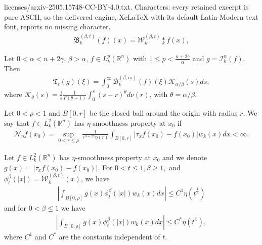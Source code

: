 \documentclass[10pt,a4paper]{amsart}
\begin{document}
licenses/arxiv-2505.15748-CC-BY-4.0.txt. Characters: every retained excerpt is pure ASCII, so the delivered engine, XeLaTeX with its default Latin Modern text font, reports no missing character.
\begin{align} \label{beta-convolution}
    \mathfrak{B}_k^{(\beta,t)}(f)(x)= \mathcal{W}_k^{(\beta,t)} \underset{k}{\ast} f(x),
\end{align}

\begin{lemma}\label{Lemma-R-2}
    Let $0< \alpha < n+2\gamma$, $\beta >\alpha $, $f\in L_k^p(\mathbb{R}^n)$ with $1\leq p < \frac{n+2\gamma}{\alpha}$ and $g=\mathcal{I}_k^\alpha(f)$. Then
    \begin{align*}
        \mathfrak{T}_\epsilon (g)(\xi)= \int_0^\infty \mathcal{B}_k^{(\beta, \epsilon s)}(f)(\xi)\mathcal{K}_{\alpha/\beta}(s)ds,
    \end{align*} where $\mathcal{K}_{\theta}(s)= \frac{1}{s} \frac{1}{\Gamma(\theta+1)}\int_0^s (s-r)^\theta d\nu(r)$, with $\theta=\alpha/\beta$. 
\end{lemma}

\begin{definition}
Let $0< \rho < 1$ and $B[0,r]$ be the closed ball around the origin with radius $r$.  We say that  $f\in L_k^{2}(\mathbb{R}^n)$ has $\eta$-smoothness property at $x_0$ if 
       \begin{align} \label{smoothness-1}
            \mathcal{N}_{\eta}f(x_0) = \underset{0<r\leq \rho}{\sup} \, \frac{1}{r^{n+2\gamma}\eta(r)} \int_{B[0,r]} |\tau_{x}f(x_0)-f(x_0)|w_k(x)dx < \infty.
       \end{align} 

\end{definition}

\begin{corollary} \label{corollary-5.4}
    Let $f\in L_k^2(\mathbb{R}^n)$ has $\eta$-smoothness property at $x_0$ and we denote $g(x)=|\tau_xf(x_0)-f(x_0)|$. For $0<t\leq 1, \beta \geq 1,$ and 
    $\phi_t^\beta(|x|)=\mathcal{W}_k^{(\beta,t)}(x)$, we have 
    \begin{align*}
       \left| \int_{B[0,\rho]} g(x)\phi_t^\beta(|x|) w_k(x)dx \right| \leq   
       C^1\eta(t^{\frac{1}{\beta}}) 
    \end{align*} and for  $0<\beta\leq 1$ we have 
    \begin{align*}
       \left| \int_{B[0,\rho]} g(x)\phi_t^\beta(|x|) w_k(x)dx \right| \leq C^{*}\eta(t^{\beta}), 
    \end{align*}
    where $C^1$ and $C^{*}$ are the constants independent of $t$. 
\end{corollary}
\end{document}
